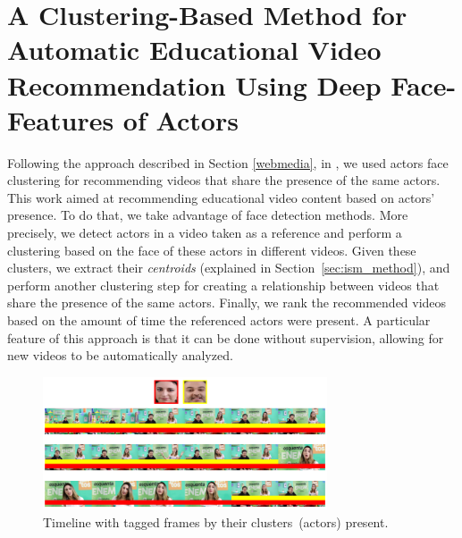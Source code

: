 \section{A Clustering-Based Method for Automatic Educational Video Recommendation Using Deep Face-Features of Actors}

Following the approach described in Section \ref{webmedia}, in \cite{mendes2020ISM}, we used actors face clustering for recommending videos that share the presence of the same actors. 
This work aimed at recommending educational video content based on actors' presence.
To do that, we take advantage of face detection methods.
More precisely, we detect actors in a video taken as a reference and perform a clustering based on the face of these actors in different videos.
Given these clusters, we extract their \textit{centroids} (explained in Section~\ref{sec:ism_method}), and perform another clustering step for creating a relationship between videos that share the presence of the same actors.
Finally, we rank the recommended videos based on the amount of time the referenced actors were present.
A particular feature of this approach is that it can be done without supervision, allowing for new videos to be automatically analyzed.


\begin{figure}[!ht]
    \centering
    \includegraphics[width=0.75\textwidth]{img/ism/educational_timeline2.png}
    \caption{Timeline with tagged frames by their clusters~(actors) present.}
    \label{fig:timeline2}
\end{figure}





